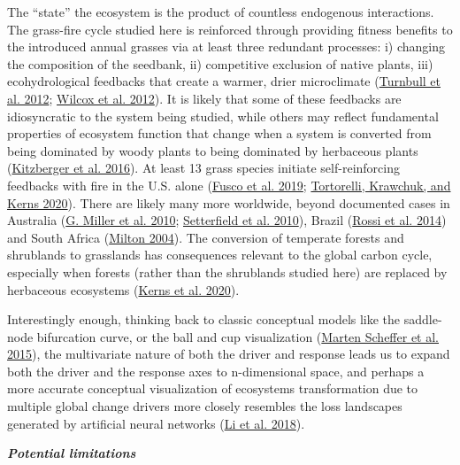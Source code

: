 \documentclass[
  12pt,
]{article}
\begin{document}
The ``state'' the ecosystem is the product of countless endogenous
interactions. The grass-fire cycle studied here is reinforced through
providing fitness benefits to the introduced annual grasses via at least
three redundant processes: i) changing the composition of the seedbank,
ii) competitive exclusion of native plants, iii) ecohydrological
feedbacks that create a warmer, drier microclimate
(\protect\hyperlink{ref-Turnbull2012}{Turnbull et al. 2012};
\protect\hyperlink{ref-Wilcox2012}{Wilcox et al. 2012}). It is likely
that some of these feedbacks are idiosyncratic to the system being
studied, while others may reflect fundamental properties of ecosystem
function that change when a system is converted from being dominated by
woody plants to being dominated by herbaceous plants
(\protect\hyperlink{ref-Kitzberger2016}{Kitzberger et al. 2016}). At
least 13 grass species initiate self-reinforcing feedbacks with fire in
the U.S. alone (\protect\hyperlink{ref-Fusco2019}{Fusco et al. 2019};
\protect\hyperlink{ref-Tortorelli2020}{Tortorelli, Krawchuk, and Kerns
2020}). There are likely many more worldwide, beyond documented cases in
Australia (\protect\hyperlink{ref-Miller2010}{G. Miller et al. 2010};
\protect\hyperlink{ref-Setterfield2010}{Setterfield et al. 2010}),
Brazil (\protect\hyperlink{ref-Rossi2014}{Rossi et al. 2014}) and South
Africa (\protect\hyperlink{ref-Milton2004}{Milton 2004}). The conversion
of temperate forests and shrublands to grasslands has consequences
relevant to the global carbon cycle, especially when forests (rather
than the shrublands studied here) are replaced by herbaceous ecosystems
(\protect\hyperlink{ref-Kerns2020}{Kerns et al. 2020}).

Interestingly enough, thinking back to classic conceptual models like
the saddle-node bifurcation curve, or the ball and cup visualization
(\protect\hyperlink{ref-Scheffer2015}{Marten Scheffer et al. 2015}), the
multivariate nature of both the driver and response leads us to expand
both the driver and the response axes to n-dimensional space, and
perhaps a more accurate conceptual visualization of ecosystems
transformation due to multiple global change drivers more closely
resembles the loss landscapes generated by artificial neural networks
(\protect\hyperlink{ref-Li2018}{Li et al. 2018}).

\textbf{\emph{Potential limitations}}
\end{document}
